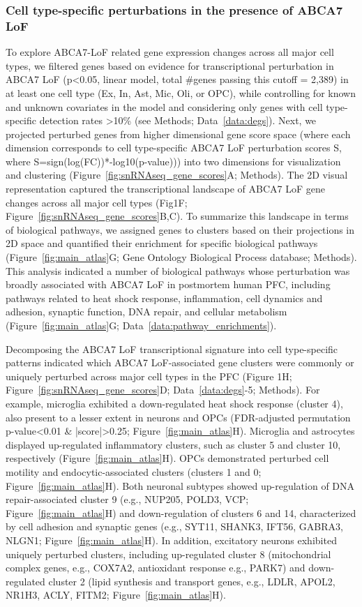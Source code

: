 \subsubsection{Cell type-specific perturbations in the presence of ABCA7 LoF}
To explore ABCA7-LoF related gene expression changes across all major cell types, we filtered genes based on evidence for transcriptional perturbation in ABCA7 LoF (p<0.05, linear model, total \#genes passing this cutoff = 2,389) in at least one cell type (Ex, In, Ast, Mic, Oli, or OPC), while controlling for known and unknown covariates in the model and considering only genes with cell type-specific detection rates >10\% (see Methods; Data~\ref{data:degs}). Next, we projected perturbed genes from higher dimensional gene score space (where each dimension corresponds to cell type-specific ABCA7 LoF perturbation scores S, where S=sign(log(FC))*-log10(p-value))) into two dimensions for visualization and clustering (Figure~\ref{fig:snRNAseq_gene_scores}A; Methods). 
The 2D visual representation captured the transcriptional landscape of ABCA7 LoF gene changes across all major cell types (Fig1F; Figure~\ref{fig:snRNAseq_gene_scores}B,C). To summarize this landscape in terms of biological pathways, we assigned genes to clusters based on their projections in 2D space and quantified their enrichment for specific biological pathways (Figure~\ref{fig:main_atlas}G; Gene Ontology Biological Process database; Methods). This analysis indicated a number of biological pathways whose perturbation was broadly associated with ABCA7 LoF in postmortem human PFC, including pathways related to heat shock response, inflammation, cell dynamics and adhesion, synaptic function, DNA repair, and cellular metabolism (Figure~\ref{fig:main_atlas}G; Data~\ref{data:pathway_enrichments}). 

Decomposing the ABCA7 LoF transcriptional signature into cell type-specific patterns indicated which ABCA7 LoF-associated gene clusters were commonly or uniquely perturbed across major cell types in the PFC (Figure 1H; Figure~\ref{fig:snRNAseq_gene_scores}D; Data~\ref{data:degs}-5; Methods). For example, microglia exhibited a down-regulated heat shock response (cluster 4), also present to a lesser extent in neurons and OPCs (FDR-adjusted permutation p-value<0.01 & |score|>0.25; Figure~\ref{fig:main_atlas}H). Microglia and astrocytes displayed up-regulated inflammatory clusters, such as cluster 5 and cluster 10, respectively (Figure~\ref{fig:main_atlas}H). OPCs demonstrated perturbed cell motility and endocytic-associated clusters (clusters 1 and 0; Figure~\ref{fig:main_atlas}H). Both neuronal subtypes showed up-regulation of DNA repair-associated cluster 9 (e.g., NUP205, POLD3, VCP; Figure~\ref{fig:main_atlas}H) and down-regulation of clusters 6 and 14, characterized by cell adhesion and synaptic genes (e.g., SYT11, SHANK3, IFT56, GABRA3, NLGN1; Figure~\ref{fig:main_atlas}H). In addition, excitatory neurons exhibited uniquely perturbed clusters, including up-regulated cluster 8 (mitochondrial complex genes, e.g., COX7A2, antioxidant response e.g., PARK7) and down-regulated cluster 2 (lipid synthesis and transport genes, e.g., LDLR, APOL2, NR1H3, ACLY, FITM2; Figure~\ref{fig:main_atlas}H).

